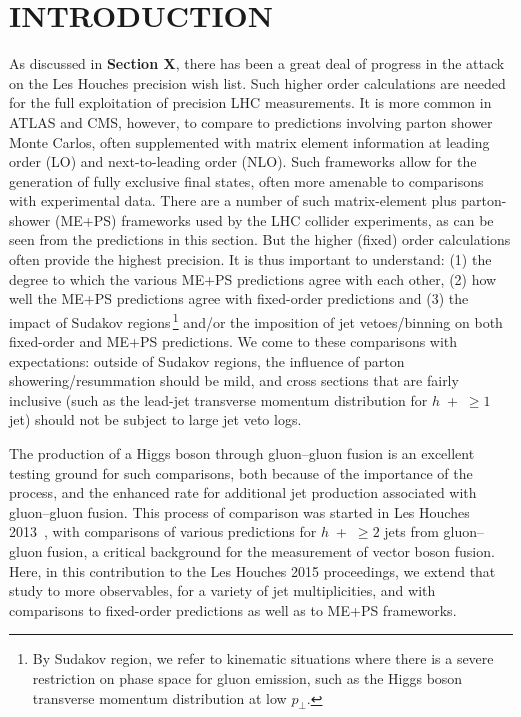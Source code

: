 \section{INTRODUCTION}
\label{sec:hjetscomp:intro}

As discussed in \textbf{Section X}, there has been a great deal of progress in
the attack on the Les Houches precision wish list. Such higher order
calculations are needed for the full exploitation of precision LHC
measurements. It is more common in ATLAS and CMS, however, to compare
to predictions involving parton shower Monte Carlos, often
supplemented with matrix element information at leading order (LO) and
next-to-leading order (NLO). Such frameworks allow for the generation
of fully exclusive final states, often more amenable to comparisons
with experimental data. There are a number of such matrix-element plus
parton-shower (ME+PS) frameworks used by the LHC collider experiments,
as can be seen from the predictions in this section. But the higher
(fixed) order calculations often provide the highest precision. It is
thus important to understand: (1) the degree to which the various
ME+PS predictions agree with each other, (2) how well the ME+PS
predictions agree with fixed-order predictions and (3) the impact of
Sudakov regions\,\footnote{By Sudakov region, we refer to kinematic
situations where there is a severe restriction on phase space for
gluon emission, such as the Higgs boson transverse momentum
distribution at low $p_\perp$.} and/or the imposition of jet
vetoes/binning on both fixed-order and ME+PS predictions.  We come to
these comparisons with expectations: outside of Sudakov regions, the
influence of parton showering/resummation should be mild, and cross
sections that are fairly inclusive (such as the lead-jet transverse
momentum distribution for $h$~+~$\ge1$ jet) should not be subject to
large jet veto logs.

The production of a Higgs boson through gluon--gluon fusion is an
excellent testing ground for such comparisons, both because of the
importance of the process, and the enhanced rate for additional jet
production associated with gluon--gluon fusion. This process of
comparison was started in Les Houches
2013~\cite{AlcarazMaestre:2012vp}, with comparisons of various
predictions for $h$~+~$\ge2$ jets from gluon--gluon fusion, a critical
background for the measurement of vector boson fusion. Here, in this
contribution to the Les Houches 2015 proceedings, we extend that study
to more observables, for a variety of jet multiplicities, and with
comparisons to fixed-order predictions as well as to ME+PS frameworks.

